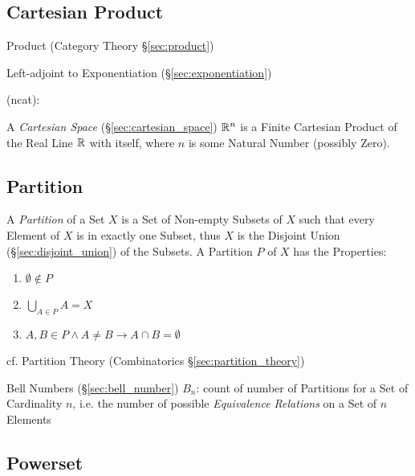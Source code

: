 \subsection{Cartesian Product}\label{sec:cartesian_product}

\fist Product (Category Theory \S\ref{sec:product})

Left-adjoint to Exponentiation (\S\ref{sec:exponentiation})

(ncat):

A \emph{Cartesian Space} (\S\ref{sec:cartesian_space}) $\mathbb{R}^n$ is a Finite
Cartesian Product of the Real Line $\mathbb{R}$ with itself, where $n$ is some
Natural Number (possibly Zero).



\subsection{Partition}\label{sec:set_partition}

A \emph{Partition} of a Set $X$ is a Set of Non-empty Subsets of $X$ such that
every Element of $X$ is in exactly one Subset, thus $X$ is the Disjoint Union
(\S\ref{sec:disjoint_union}) of the Subsets. A Partition $P$ of $X$ has the
Properties:
\begin{enumerate}
  \item $\emptyset \notin P$
  \item $\bigcup_{A \in P}A = X$
  \item $A,B \in P \wedge A \neq B \to A \cap B = \emptyset$
\end{enumerate}

cf. Partition Theory (Combinatorics \S\ref{sec:partition_theory})

Bell Numbers (\S\ref{sec:bell_number}) $B_n$: count of number of Partitions for
a Set of Cardinality $n$, i.e. the number of possible \emph{Equivalence
Relations} on a Set of $n$ Elements



\subsection{Powerset}\label{sec:powerset}

